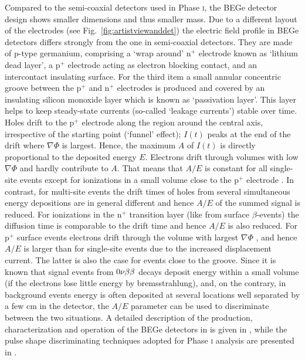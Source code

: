 Compared to the semi-coaxial detectors used in {\gerda} Phase \textsc{i}, the BEGe detector design shows smaller dimensions and thus smaller mass. Due to a different layout of the electrodes (see Fig.~\ref{fig:artistviewanddet}) the electric field profile in BEGe detectors differs strongly from the one in semi-coaxial detectors. They are made of p-type germanium, comprising a `wrap around' n$^+$ electrode known as `lithium dead layer', a p$^+$ electrode acting as electron blocking contact, and an intercontact insulating surface. For the third item a small annular concentric groove between the p$^+$ and n$^+$ electrodes is produced and covered by an insulating silicon monoxide layer which is known as `passivation layer'. This layer helps to keep steady-state currents (so-called `leakage currents') stable over time. Holes drift to the p$^+$ electrode along the region around the central axis, irrespective of the starting point (`funnel' effect); $I(t)$ peaks at the end of the drift where $\nabla\Phi$ is largest. Hence, the maximum $A$ of $I(t)$ is directly proportional to the deposited energy $E$. Electrons drift through volumes with low $\nabla\Phi$ and hardly contribute to $A$. That means that $A/E$ is constant for all single-site events except for ionizations in a small volume close to the p$^+$ electrode \cite{PSD1, PSD2, PSD3}. In contrast, for multi-site events the drift times of holes from several simultaneous energy depositions are in general different and hence $A/E$ of the summed signal is reduced. For ionizations in the n$^+$ transition layer (like from surface $\beta$-events) the diffusion time is comparable to the drift time and hence $A/E$ is also reduced. For p$^+$ surface events electrons drift through the volume with largest $\nabla\Phi$ , and hence $A/E$ is larger than for single-site events due to the increased displacement current. The latter is also the case for events close to the groove. Since it is known that signal events from $0\nu\beta\beta$ decays deposit energy within a small volume (if the electrons lose little energy by bremsstrahlung), and, on the contrary, in background events energy is often deposited at several locations well separated by a few cm in the detector, the $A/E$ parameter can be used to discriminate between the two situations. A detailed description of the production, characterization and operation of the BEGe detectors in {\gerda} is given in \cite{detectors}, while the pulse shape discriminating techniques adopted for Phase \textsc{i} analysis are presented in \cite{PSDgerda}.

